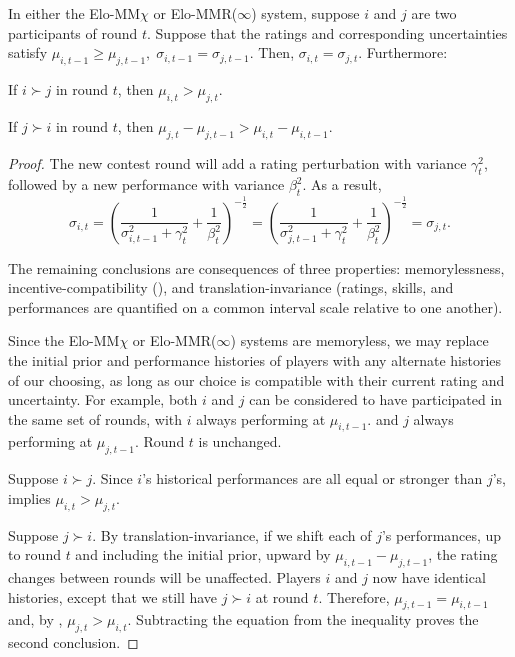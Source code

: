 \begin{theorem}
In either the Elo-MM$\chi$ or Elo-MMR($\infty$) system, suppose $i$ and $j$ are two participants of round $t$. Suppose that the ratings and corresponding uncertainties satisfy $\mu_{i,t-1} \ge \mu_{j,t-1},\; \sigma_{i,t-1} = \sigma_{j,t-1}$. Then, $\sigma_{i,t} = \sigma_{j,t}$. Furthermore:

If $i \succ j$ in round $t$, then $\mu_{i,t} > \mu_{j,t}$.

If $j \succ i$ in round $t$, then $\mu_{j,t} - \mu_{j,t-1} > \mu_{i,t} - \mu_{i,t-1}$.
\end{theorem}

\begin{proof}
The new contest round will add a rating perturbation with variance $\gamma_t^2$, followed by a new performance with variance $\beta_t^2$. As a result,
\[\sigma_{i,t}
= \left( \frac{1}{\sigma_{i,t-1}^2 + \gamma_t^2} + \frac{1}{\beta_t^2} \right)^{-\frac 12}
= \left( \frac{1}{\sigma_{j,t-1}^2 + \gamma_t^2} + \frac{1}{\beta_t^2} \right)^{-\frac 12}
= \sigma_{j,t}.\]

The remaining conclusions are consequences of three properties: memorylessness, incentive-compatibility (), and translation-invariance (ratings, skills, and performances are quantified on a common interval scale relative to one another).

Since the Elo-MM$\chi$ or Elo-MMR($\infty$) systems are memoryless, we may replace the initial prior and performance histories of players with any alternate histories of our choosing, as long as our choice is compatible with their current rating and uncertainty. For example, both $i$ and $j$ can be considered to have participated in the same set of rounds, with $i$ always performing at $\mu_{i,t-1}$. and $j$ always performing at $\mu_{j,t-1}$. Round $t$ is unchanged.

Suppose $i \succ j$. Since $i$'s historical performances are all equal or stronger than $j$'s,  implies $\mu_{i,t} > \mu_{j,t}$.

Suppose $j \succ i$. By translation-invariance, if we shift each of $j$'s performances, up to round $t$ and including the initial prior, upward by $\mu_{i,t-1} - \mu_{j,t-1}$, the rating changes between rounds will be unaffected. Players $i$ and $j$ now have identical histories, except that we still have $j\succ i$ at round $t$. Therefore, $\mu_{j,t-1} = \mu_{i,t-1}$ and, by , $\mu_{j,t} > \mu_{i,t}$. Subtracting the equation from the inequality proves the second conclusion.
\end{proof}

